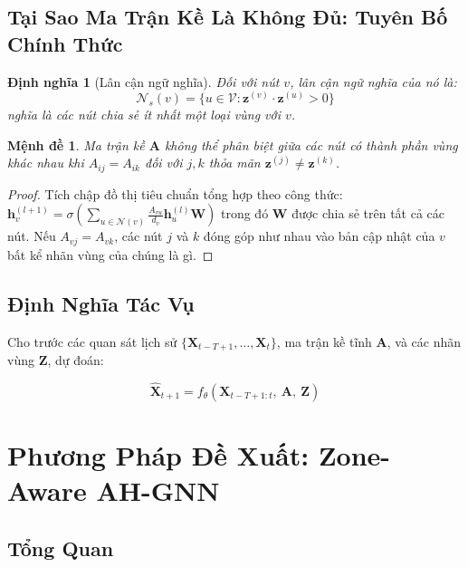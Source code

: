 \documentclass[12pt,a4paper]{article}
\newtheorem{definition}{Định nghĩa}
\newtheorem{proposition}{Mệnh đề}
\begin{document}
\subsection{Tại Sao Ma Trận Kề Là Không Đủ: Tuyên Bố Chính Thức}

\begin{definition}[Lân cận ngữ nghĩa]
Đối với nút $v$, lân cận ngữ nghĩa của nó là:
\[
\mathcal{N}_s(v) = \{u \in \mathcal{V} : \mathbf{z}^{(v)} \cdot \mathbf{z}^{(u)} > 0 \}
\]
nghĩa là các nút chia sẻ ít nhất một loại vùng với $v$.
\end{definition}

\begin{proposition}
Ma trận kề $\mathbf{A}$ không thể phân biệt giữa các nút có
thành phần vùng khác nhau khi $A_{ij} = A_{ik}$ đối với $j,k$ thỏa mãn
$\mathbf{z}^{(j)} \neq \mathbf{z}^{(k)}$.
\end{proposition}

\begin{proof}
Tích chập đồ thị tiêu chuẩn tổng hợp theo công thức:
$\mathbf{h}_v^{(l+1)} = \sigma\!\left(\sum_{u \in \mathcal{N}(v)} \frac{A_{vu}}{d_v}
\mathbf{h}_u^{(l)} \mathbf{W}\right)$
trong đó $\mathbf{W}$ được chia sẻ trên tất cả các nút. Nếu $A_{vj} = A_{vk}$, các nút
$j$ và $k$ đóng góp như nhau vào bản cập nhật của $v$ bất kể nhãn vùng của chúng là gì.
\end{proof}

\subsection{Định Nghĩa Tác Vụ}

Cho trước các quan sát lịch sử $\{\mathbf{X}_{t-T+1}, \ldots, \mathbf{X}_t\}$,
ma trận kề tĩnh $\mathbf{A}$, và các nhãn vùng $\mathbf{Z}$, dự đoán:

\begin{equation}
\hat{\mathbf{X}}_{t+1} = f_\theta\!\left(\mathbf{X}_{t-T+1:t},\ \mathbf{A},\ \mathbf{Z}\right)
\end{equation}

\section{Phương Pháp Đề Xuất: Zone-Aware AH-GNN}

\subsection{Tổng Quan}
\end{document}
